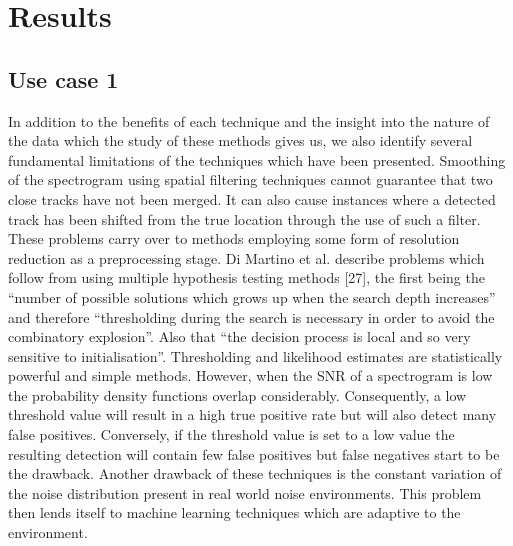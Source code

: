 

    \chapter{Results}

    \section{Use case 1}
    In addition to the benefits of each technique and the insight into the
    nature of the data which the study of these methods gives us, we also identify
    several fundamental limitations of the techniques which have been presented.
    Smoothing of the spectrogram using spatial filtering techniques cannot
    guarantee that two close tracks have not been merged. It can also cause
    instances where a detected track has been shifted from the true location
    through the use of such a filter. These problems carry over to methods
    employing some form of resolution reduction as a preprocessing stage.
    Di Martino et al. describe problems which follow from using multiple
    hypothesis testing methods [27], the first being the “number of possible
    solutions which grows up when the search depth increases” and therefore
    “thresholding during the search is necessary in order to avoid the combinatory explosion”. Also that “the decision process is local and so very sensitive
    to initialisation”.
    Thresholding and likelihood estimates are statistically powerful and simple methods. However, when the SNR of a spectrogram is low the probability
    density functions overlap considerably. Consequently, a low threshold value
    will result in a high true positive rate but will also detect many false positives. Conversely, if the threshold value is set to a low value the resulting
    detection will contain few false positives but false negatives start to be the drawback. Another drawback of these techniques is the constant variation of
    the noise distribution present in real world noise environments. This problem
    then lends itself to machine learning techniques which are adaptive to the
    environment.

